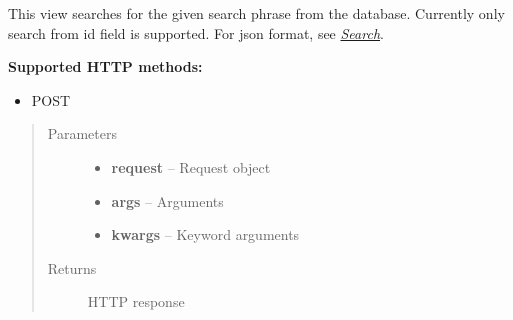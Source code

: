 \documentclass[letterpaper,10pt,english]{sphinxmanual}
\begin{document}

\begin{fulllineitems}
\label{codedoc/locdoc:lbd_backend.LBD_REST_locationdata.views.search_from_rest}
This view searches for the given search phrase from the database. Currently only search from id field is supported.
For json format, see {\hyperref[json/search:searchjson]{\emph{Search}}}.

\textbf{Supported HTTP methods:}
\begin{itemize}
\item {} 
POST

\end{itemize}
\begin{quote}\begin{description}
\item[{Parameters}] \leavevmode\begin{itemize}
\item {} 
\textbf{request} -- Request object

\item {} 
\textbf{args} -- Arguments

\item {} 
\textbf{kwargs} -- Keyword arguments

\end{itemize}

\item[{Returns}] \leavevmode
HTTP response

\end{description}\end{quote}

\end{fulllineitems}

\end{document}
